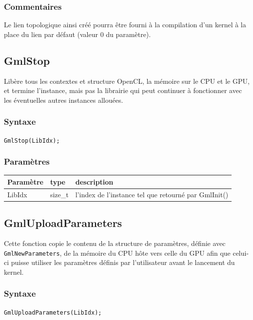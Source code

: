 \documentclass[a4paper,12pt]{article}
\begin{document}
\subsubsection*{Commentaires}
Le lien topologique ainsi créé pourra être fourni à la compilation d'un kernel à la place du lien par défaut (valeur 0 du paramètre).


\subsection{GmlStop}

Libère tous les contextes et structure OpenCL, la mémoire sur le CPU et le GPU, et termine l'instance, mais pas la librairie qui peut continuer à fonctionner avec les éventuelles autres instances allouées.

\subsubsection*{Syntaxe}

{\tt GmlStop(LibIdx);}

\subsubsection*{Paramètres}

\begin{tabular}{|m{2cm}|m{1.5cm}|m{10.5cm}|}
\hline
Paramètre  & type    & description \\
\hline
LibIdx     & size\_t & l'index de l'instance tel que retourné par GmlInit() \\
\hline
\end{tabular}


\subsection{GmlUploadParameters}

Cette fonction copie le contenu de la structure de paramètres, définie avec {\tt GmlNewParameters}, de la mémoire du CPU hôte vers celle du GPU afin que celui-ci puisse utiliser les paramètres définis par l'utilisateur avant le lancement du kernel.

\subsubsection*{Syntaxe}
{\tt GmlUploadParameters(LibIdx);}


%
%
\end{document}
